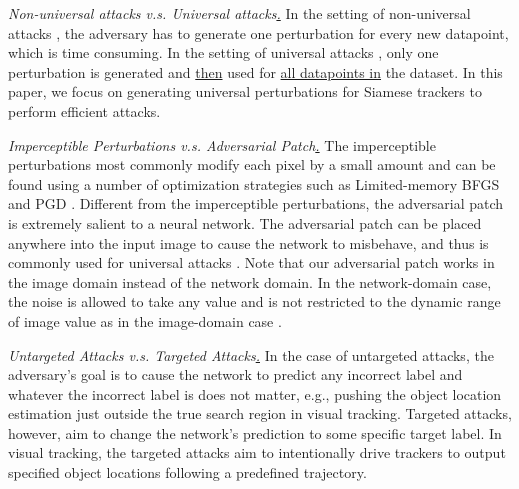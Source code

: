 \documentclass[journal]{IEEEtran}
\newcommand{\eg}{e.g.}
\begin{document}
\textit{Non-universal attacks v.s. Universal attacks\uline{.}} In the setting of non-universal attacks \cite{dai2018adversarial,li2018second,lin2017tactics}, the adversary has to generate one perturbation for every new datapoint, which is time consuming. In the setting of universal attacks \cite{khrulkov2018art,mopuri2018nag,zhang2020understanding,mopuri2018generalizable,chen2018shapeshifter}, only one perturbation is generated and \uline{then} used for \uline{all datapoints in} the dataset. In this paper, we focus on generating universal perturbations for Siamese trackers to perform efficient attacks.

\textit{Imperceptible Perturbations v.s. Adversarial Patch\uline{.}} The imperceptible perturbations most commonly modify each pixel by a small amount and can be found using a number of optimization strategies such as Limited-memory BFGS \cite{intriguing} and PGD \cite{PGD}. Different from the imperceptible perturbations, the adversarial patch is extremely salient to a neural network. The adversarial patch can be placed anywhere into the input image to cause the network to misbehave, and thus is commonly used for universal attacks \cite{patch}. Note that our adversarial patch works in the image domain instead of the network domain. In the network-domain case, the noise is allowed to take any value and is not restricted to the dynamic range of image value as in the image-domain case \cite{karmon2018lavan}.

\textit{Untargeted Attacks v.s. Targeted Attacks\uline{.}} In the case of untargeted attacks, the adversary's goal is to cause the network to predict any incorrect label and whatever the incorrect label is does not matter, \eg, pushing the object location estimation just outside the true search region in visual tracking. Targeted attacks, however, aim to change the network's prediction to some specific target label. In visual tracking, the targeted attacks aim to intentionally drive trackers to output specified object locations following a predefined trajectory.
\vspace{-2mm}
\end{document}
